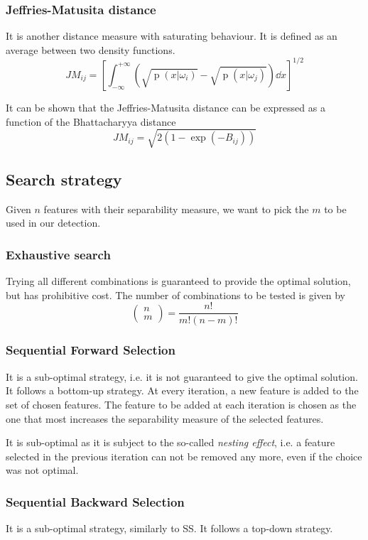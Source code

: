 \documentclass[oneside,onecolumn]{report}
\DeclareMathOperator*{\pdf}{p}
\begin{document}
\subsubsection{Jeffries-Matusita distance}
It is another distance measure with saturating behaviour.
It is defined as an average between two density functions.
$$ JM_{ij} = \left[ \int_{-\infty}^{+\infty} \left( \sqrt{\pdf(x | \omega_i)} - \sqrt{\pdf(x | \omega_j)} \right) \dd x \right]^{1/2} $$

It can be shown that the Jeffries-Matusita distance can be expressed as a function of the Bhattacharyya distance
$$ JM_{ij} = \sqrt{2 (1 - \exp(-B_{ij}))} $$


\subsection{Search strategy}
Given $n$ features with their separability measure, we want to pick the $m$ to be used in our detection.

\subsubsection{Exhaustive search}
Trying all different combinations is guaranteed to provide the optimal solution, but has prohibitive cost.
The number of combinations to be tested is given by
$$ \begin{pmatrix} n \\ m \end{pmatrix} = \frac{n!}{m! (n - m)!} $$

\subsubsection{Sequential Forward Selection}
It is a sub-optimal strategy, i.e. it is not guaranteed to give the optimal solution.
It follows a bottom-up strategy.
At every iteration, a new feature is added to the set of chosen features.
The feature to be added at each iteration is chosen as the one that most increases the separability measure of the selected features.

It is sub-optimal as it is subject to the so-called \emph{nesting effect}, i.e. a feature selected in the previous iteration can not be removed any more, even if the choice was not optimal.

\subsubsection{Sequential Backward Selection}
It is a sub-optimal strategy, similarly to SS.
It follows a top-down strategy.
\end{document}
